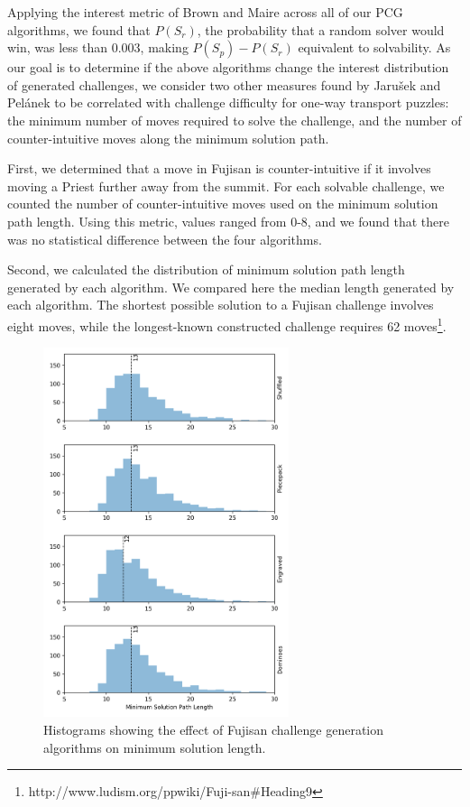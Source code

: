 \documentclass[journal]{IEEEtran}
\begin{document}
Applying the interest metric of Brown and Maire \cite{MCPUZZLE} across all of our PCG algorithms, we found that $P(S_r)$, the probability that a random solver would win, was less than 0.003, making $P(S_p) - P(S_r)$ equivalent to solvability. As our goal is to determine if the above algorithms change the interest distribution of generated challenges, we consider two other measures found by 
Jaru{\v{s}}ek and Pel{\'a}nek to be correlated with challenge difficulty for one-way transport puzzles:
the minimum number of moves required to solve the challenge, and the number of counter-intuitive moves along the minimum solution path. \cite{jaruvsek2010difficulty}
\cite{jaruvsek2011determines}

First, we determined that a move in Fujisan is counter-intuitive if it involves moving a Priest further away from the summit. For each solvable challenge, we counted the number of counter-intuitive moves used on the minimum solution path length. Using this metric, values ranged from 0-8, and we found that there was no statistical difference between the four algorithms.

Second, we calculated the distribution of minimum solution path length generated by each algorithm. We compared here the median length generated by each algorithm. The shortest possible solution to a Fujisan challenge involves eight moves, while 
the longest-known constructed challenge requires 62 moves\footnote{http://www.ludism.org/ppwiki/Fuji-san\#Heading9}.

\begin{figure}[t]
\centering
\includegraphics[width=7.2cm]{figure17.png}
\caption{Histograms showing the effect of Fujisan challenge generation algorithms on minimum solution length.}
\label{fig:difficultycomp}
\end{figure}
\end{document}
